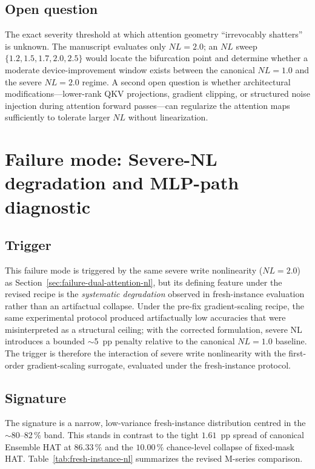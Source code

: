\subsection{Open question}

The exact severity threshold at which attention geometry ``irrevocably shatters'' is unknown.  The manuscript evaluates only $NL=2.0$; an $NL$ sweep $\{1.2, 1.5, 1.7, 2.0, 2.5\}$ would locate the bifurcation point and determine whether a moderate device-improvement window exists between the canonical $NL=1.0$ and the severe $NL=2.0$ regime.  A second open question is whether architectural modifications---lower-rank QKV projections, gradient clipping, or structured noise injection during attention forward passes---can regularize the attention maps sufficiently to tolerate larger $NL$ without linearization.


\section{Failure mode: Severe-NL degradation and MLP-path diagnostic}
\label{sec:failure-severe-nl-degradation}

\subsection{Trigger}

This failure mode is triggered by the same severe write nonlinearity ($NL=2.0$) as Section~\ref{sec:failure-dual-attention-nl}, but its defining feature under the revised recipe is the \emph{systematic degradation} observed in fresh-instance evaluation rather than an artifactual collapse.  Under the pre-fix gradient-scaling recipe, the same experimental protocol produced artifactually low accuracies that were misinterpreted as a structural ceiling; with the corrected formulation, severe NL introduces a bounded $\sim$5~pp penalty relative to the canonical $NL=1.0$ baseline.  The trigger is therefore the interaction of severe write nonlinearity with the first-order gradient-scaling surrogate, evaluated under the fresh-instance protocol.

\subsection{Signature}

The signature is a narrow, low-variance fresh-instance distribution centred in the $\sim$80--82\,\% band.  This stands in contrast to the tight $1.61$~pp spread of canonical Ensemble HAT at $86.33\,\%$ and the $10.00\,\%$ chance-level collapse of fixed-mask HAT.  Table~\ref{tab:fresh-instance-nl} summarizes the revised M-series comparison.

